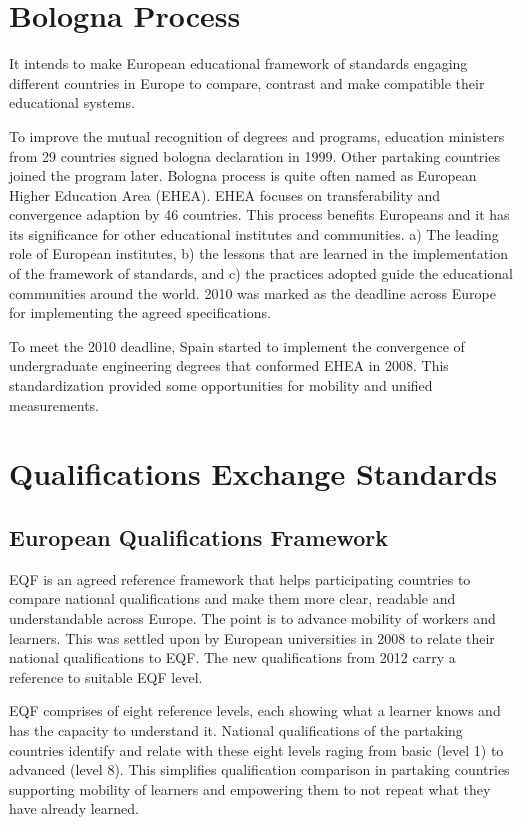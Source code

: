 \documentclass[12pt,a4paper,oneside]{book} %
\begin{document}
\section{Bologna Process}

It intends to make European educational framework of standards engaging different countries in Europe to compare, contrast and make compatible their educational systems. \cite{bologna process}

To improve the mutual recognition of degrees and programs, education ministers from 29 countries signed bologna declaration in 1999. Other partaking countries joined the program later. \cite{improvement bologna process} Bologna process is quite often named as European Higher Education Area (EHEA). EHEA focuses on transferability and convergence adaption by 46 countries. This process benefits Europeans and it has its significance for other educational institutes and communities. a) The leading role of European institutes, b) the lessons that are learned in the implementation of the framework of standards, and c) the practices adopted guide the educational communities around the world. 2010 was marked as the deadline across Europe for implementing the agreed specifications. \cite{European Higher Education Area }

To meet the 2010 deadline, Spain started to implement the convergence of undergraduate engineering degrees that conformed EHEA in 2008. This standardization provided some opportunities for mobility and unified measurements. \cite{European Higher Education Area }




\section{Qualifications Exchange Standards}

    \subsection{European Qualifications Framework}
    EQF is an agreed reference framework that helps participating countries to compare national qualifications and make them more clear, readable and understandable across Europe. The point is to advance mobility of workers and learners. This was settled upon by European universities in 2008 to relate their national qualifications to EQF. The new qualifications from 2012 carry a reference to suitable EQF level.

    EQF comprises of eight reference levels, each showing what a learner knows and has the capacity to understand it. National qualifications of the partaking countries identify and relate with these eight levels raging from basic (level 1) to advanced (level 8). This simplifies qualification comparison in partaking countries supporting mobility of learners and empowering them to not repeat what they have already learned.
    
\end{document}
